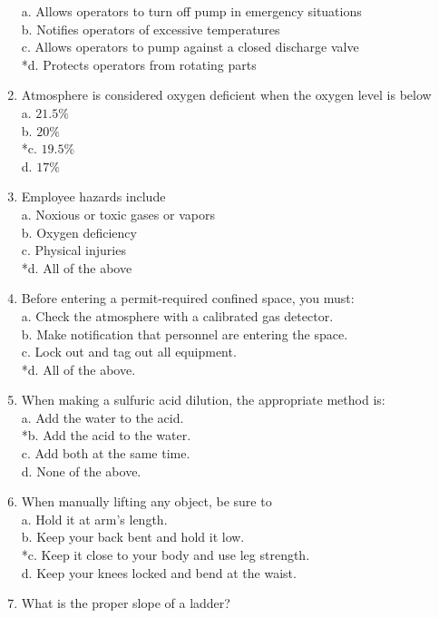 \begin{enumerate}[1.]
a. Allows operators to turn off pump in emergency situations\\
b. Notifies operators of excessive temperatures\\
c. Allows operators to pump against a closed discharge valve\\
*d. Protects operators from rotating parts\\
\item Atmosphere is considered oxygen deficient when the oxygen level is below\\
a. $21.5 \%$\\
b. $20 \%$\\
*c. $19.5 \%$\\
d. $17 \%$\\
\item Employee hazards include\\
a. Noxious or toxic gases or vapors\\
b. Oxygen deficiency\\
c. Physical injuries\\
*d. All of the above\\
\item Before entering a permit-required confined space, you must:\\
a. Check the atmosphere with a calibrated gas detector.\\
b. Make notification that personnel are entering the space.\\
c. Lock out and tag out all equipment.\\
*d. All of the above.\\
\item When making a sulfuric acid dilution, the appropriate method is:\\
a. Add the water to the acid.\\
*b. Add the acid to the water.\\
c. Add both at the same time.\\
d. None of the above.\\
\item When manually lifting any object, be sure to\\
a. Hold it at arm's length.\\
b. Keep your back bent and hold it low.\\
*c. Keep it close to your body and use leg strength.\\
d. Keep your knees locked and bend at the waist.\\
\item What is the proper slope of a ladder?\\

\end{enumerate}
